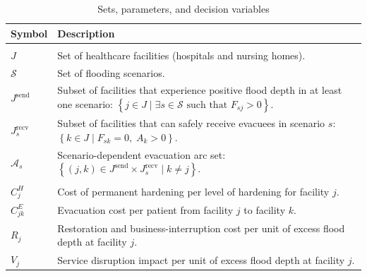 \documentclass[preprint,11pt,authoryear]{elsarticle}
\begin{document}
\begin{table}[!t]
\centering
\caption{Sets, parameters, and decision variables}
\label{tbl:Notation_healthcaresys}

\footnotesize
{}
\setlength{\tabcolsep}{4pt}
\renewcommand{\arraystretch}{1.05}

\begin{tabularx}{\textwidth}{
    @{}
    >{\raggedright\arraybackslash}p{}
    >{\raggedright\arraybackslash}X
    @{}
}
\toprule
Symbol & Description \\
\midrule

\multicolumn{2}{@{}l}{\textit{Sets}} \\
\addlinespace[2pt]

$J$
& Set of healthcare facilities (hospitals and nursing homes). \\

$\mathcal{S}$
& Set of flooding scenarios. \\

$J^{\text{send}}$
& Subset of facilities that experience positive flood depth in at least one
scenario:
$\left\{j\in J \mid \exists s\in\mathcal{S}\text{ such that }F_{sj}>0\right\}$. \\

$J^{\text{recv}}_{s}$
& Subset of facilities that can safely receive evacuees in scenario $s$:
$\left\{k\in J \mid F_{sk}=0,\;A_k>0\right\}$. \\

$\mathcal{A}_s$
& Scenario-dependent evacuation arc set:
$\left\{(j,k)\in J^{\text{send}}\times J^{\text{recv}}_s \mid k\neq j\right\}$. \\
\midrule

\addlinespace[4pt]
\multicolumn{2}{@{}l}{\textit{Parameters}} \\
\addlinespace[2pt]

$C_j^{H}$
& Cost of permanent hardening per level of hardening for facility $j$. \\

$C_{jk}^{E}$
& Evacuation cost per patient from facility $j$ to facility $k$. \\

$R_j$
& Restoration and business-interruption cost per unit of excess flood depth
at facility $j$. \\

$V_j$
& Service disruption impact per unit of excess flood depth at facility $j$. \\


\end{tabularx}
\end{table}
\end{document}
